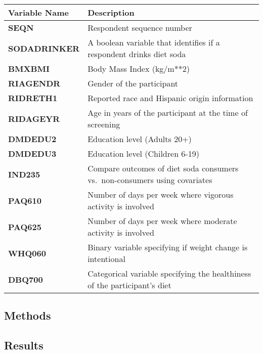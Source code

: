 \documentclass[
  11pt,
]{article}
\begin{document}
\begin{longtable}[]{@{}
  >{\raggedright\arraybackslash}p{}
  >{\raggedright\arraybackslash}p{}@{}}
\toprule\noalign{}
\begin{minipage}[b]{\linewidth}\raggedright
Variable Name
\end{minipage} & \begin{minipage}[b]{\linewidth}\raggedright
\textbf{Description}
\end{minipage} \\
\midrule\noalign{}
\endhead
\bottomrule\noalign{}
\endlastfoot
\textbf{SEQN} & Respondent sequence number \\
\textbf{SODADRINKER} & A boolean variable that identifies if a
respondent drinks diet soda \\
\textbf{BMXBMI} & Body Mass Index (kg/m**2) \\
\textbf{RIAGENDR} & Gender of the participant \\
\textbf{RIDRETH1} & Reported race and Hispanic origin information \\
\textbf{RIDAGEYR} & Age in years of the participant at the time of
screening \\
\textbf{DMDEDU2} & Education level (Adults 20+) \\
\textbf{DMDEDU3} & Education level (Children 6-19) \\
\textbf{IND235} & Compare outcomes of diet soda consumers
vs.~non-consumers using covariates \\
\textbf{PAQ610} & Number of days per week where vigorous activity is
involved \\
\textbf{PAQ625} & Number of days per week where moderate activity is
involved \\
\textbf{WHQ060} & Binary variable specifying if weight change is
intentional \\
\textbf{DBQ700} & Categorical variable specifying the healthiness of the
participant's diet \\
\end{longtable}

\subsection{Methods}\label{methods}

\subsection{Results}\label{results}
\end{document}
